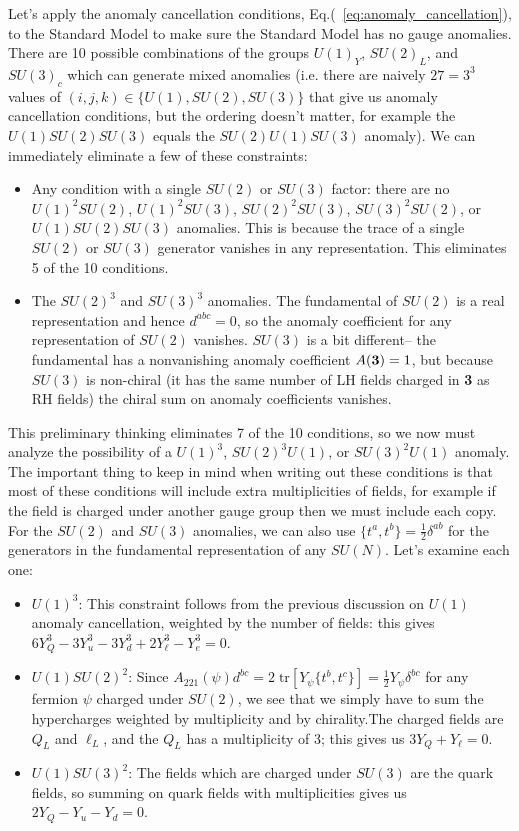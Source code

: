 \documentclass[11pt, oneside]{article}   	%
\theoremstyle{definition}
\numberwithin{equation}{subsection}		%
\begin{document}
Let's apply the anomaly cancellation conditions, Eq.(~\ref{eq:anomaly_cancellation}), to the Standard Model to make sure the Standard Model 
has no gauge anomalies. There are 10 possible combinations of the groups $U(1)_Y$, $SU(2)_L$, and $SU(3)_c$ which can generate mixed anomalies 
(i.e. there are naively $27 = 3^3$ values of $(i, j, k)\in \{U(1), SU(2), SU(3)\}$ that give us anomaly cancellation conditions, but the ordering doesn't matter, 
for example the $U(1)SU(2)SU(3)$ equals the $SU(2) U(1) SU(3)$ anomaly). We can immediately eliminate a few of these constraints:
\begin{itemize}
	\item Any condition with a single $SU(2)$ or $SU(3)$ factor: there are no $U(1)^2 SU(2)$, $U(1)^2 SU(3)$, $SU(2)^2 SU(3)$, $SU(3)^2 SU(2)$, or 
	$U(1) SU(2) SU(3)$ anomalies. This is because the trace of a single $SU(2)$ or $SU(3)$ generator vanishes in any representation. This eliminates 
	5 of the 10 conditions.
	\item The $SU(2)^3$ and $SU(3)^3$ anomalies. The fundamental of $SU(2)$ is a real representation and hence $d^{abc} = 0$, so the anomaly coefficient 
	for any representation of $SU(2)$ vanishes. $SU(3)$ is a bit different-- the fundamental has a nonvanishing anomaly coefficient $A(\textnormal{\textbf{3}}) = 1$, 
	but because $SU(3)$ is non-chiral (it has the same number of LH fields charged in \textbf{3} as RH fields) the chiral sum on anomaly coefficients vanishes.
\end{itemize}
This preliminary thinking eliminates 7 of the 10 conditions, so we now must analyze the possibility of a $U(1)^3$, $SU(2)^3 U(1)$, or $SU(3)^2 U(1)$ anomaly. 
The important thing to keep in mind when writing out these conditions is that most of these conditions will include extra multiplicities of fields, for example if 
the field is charged under another gauge group then we must include each copy. For the $SU(2)$ and $SU(3)$ anomalies, we can also 
use $\{t^a, t^b\} = \frac{1}{2}\delta^{ab}$ for the generators in the fundamental representation of any $SU(N)$. Let's examine each one:
\begin{itemize}
	\item $U(1)^3$: This constraint follows from the previous discussion on $U(1)$ anomaly cancellation, weighted by the number of fields: this gives 
	$6 Y_Q^3 - 3 Y_u^3 - 3 Y_d^3 + 2 Y_\ell^3 - Y_e^3 = 0$. 
	\item $U(1) SU(2)^2$: Since $A_{221}(\psi) d^{bc} = 2\;\mathrm{tr}[Y_\psi \{t^b, t^c\}] = \frac{1}{2} Y_\psi \delta^{bc}$ for any fermion $\psi$ charged under $SU(2)$, 
	we see that we simply have to sum the hypercharges weighted by multiplicity and by chirality.The charged fields are $Q_L$ and $\ell_L$, 
	and the $Q_L$ has a multiplicity of 3; this gives us $3 Y_Q + Y_\ell = 0$. 
	\item $U(1) SU(3)^2$: The fields which are charged under $SU(3)$ are the quark fields, so summing on quark fields with multiplicities gives us $2 Y_Q - Y_u - Y_d = 0$. 
\end{itemize}
\end{document}
